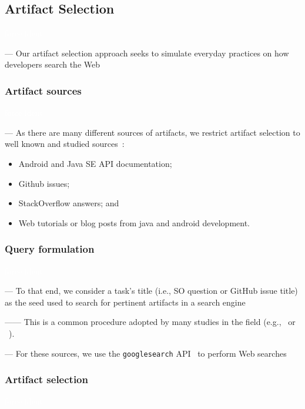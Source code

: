 \subsection{Artifact Selection}
\label{cp4:corpus-artifacts}
\textcolor{white}{force ident} %


--- Our artifact selection approach seeks to simulate everyday practices on how developers search the Web~\cite{rao2020, Xia2017} \vspace{3mm}


\subsubsection{Artifact sources}
\textcolor{white}{force ident} %

--- As there are many different sources of artifacts, we restrict artifact selection to well known and studied sources~\cite{Starke2009,Kevic2014, Li2013}:


\begin{itemize}
    \item Android and Java SE API documentation;
    \item Github issues;
    \item StackOverflow answers; and
    \item Web tutorials or blog posts from java and android development.
\end{itemize}


\vspace{3mm}


\subsubsection{Query formulation}
\textcolor{white}{force ident} %

--- To that end, we consider a task's title (i.e., SO question or GitHub issue title) as the seed used to search for pertinent artifacts in a search engine

------ This is a common procedure adopted by many studies in the field (e.g.,~\cite{Xu2017} or ~\cite{Silva2019}). \vspace{3mm}


--- For these sources, we use the \texttt{googlesearch} API~\cite{googlesearch} to perform Web searches


\subsubsection{Artifact selection}
\textcolor{white}{force ident} %

